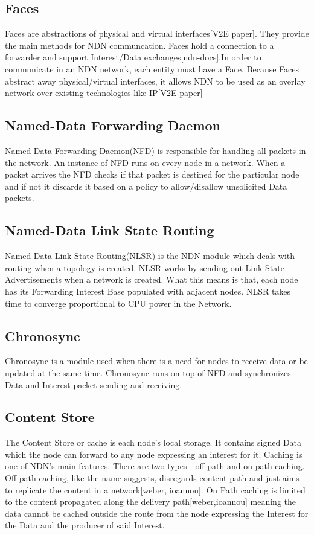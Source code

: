 \subsection{Faces}
Faces are abstractions of physical and virtual interfaces[V2E paper]. They provide the main methods for NDN communcation. Faces hold a connection to a forwarder and support Interest/Data exchanges[ndn-docs].In order to communicate in an NDN network, each entity must have a Face. Because Faces abstract away physical/virtual interfaces, it allows NDN to be used as an overlay network over existing technologies like IP[V2E paper]
\subsection{Named-Data Forwarding Daemon}
Named-Data Forwarding Daemon(NFD) is responsible for handling all packets in the network. An instance of NFD runs on every node in a network. When a packet arrives the NFD checks if that packet is destined for the particular node and if not it discards it based on a policy to allow/disallow unsolicited Data packets.
\subsection{Named-Data Link State Routing}
Named-Data Link State Routing(NLSR) is the NDN module which deals with routing when a topology is created. NLSR works by sending out Link State Advertisements when a network is created. What this means is that, each node has its Forwarding Interest Base populated with adjacent nodes. NLSR takes time to converge proportional to CPU power in the Network. 
\subsection{Chronosync}
Chronosync is a module used when there is a need for nodes to receive data or be updated at the same time. Chronosync runs on top of NFD and synchronizes Data and Interest packet sending and receiving.
\subsection{Content Store}
The Content Store or cache is each node's local storage. It contains signed Data which the node can forward to any node expressing an interest for it. Caching is one of NDN's main features. There are two types - off path and on path caching. Off path caching, like the name suggests, disregards content path and just aims to replicate the content in a network[weber, ioannou]. On Path caching is limited to the content propagated along the delivery path[weber,ioannou] meaning the data cannot be cached outside the route from the node expressing the Interest for the Data and the producer of said Interest.
